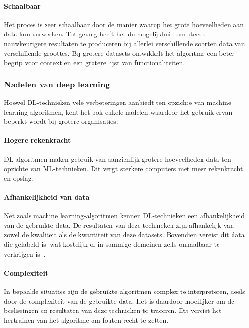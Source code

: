 \paragraph{Schaalbaar}
Het proces is zeer schaalbaar door de manier waarop het grote hoeveelheden aan data kan verwerken.
Tot gevolg heeft het de mogelijkheid om steeds nauwkeurigere resultaten te produceren bij allerlei verschillende soorten data van verschillende groottes.
Bij grotere datasets ontwikkelt het algoritme een beter begrip voor context en een grotere lijst van functionaliteiten.

\subsubsection{Nadelen van deep learning}
Hoewel DL-technieken vele verbeteringen aanbiedt ten opzichte van machine learning-algoritmen, kent het ook enkele nadelen waardoor het gebruik ervan beperkt wordt bij grotere organisaties:

\paragraph{Hogere rekenkracht}
DL-algoritmen maken gebruik van aanzienlijk grotere hoeveelheden data ten opzichte van ML-technieken.
Dit vergt sterkere computers met meer rekenkracht en opslag.

\paragraph{Afhankelijkheid van data}
Net zoals machine learning-algoritmen kennen DL-technieken een afhankelijkheid van de gebruikte data.
De resultaten van deze technieken zijn afhankelijk van zowel de kwaliteit als de kwantiteit van deze datasets.
Bovendien vereist dit data die gelabeld is, wat kostelijk of in sommige domeinen zelfs onhaalbaar te verkrijgen is~\autocite{Olaoye2024a}.

\paragraph{Complexiteit}
In bepaalde situaties zijn de gebruikte algoritmen complex te interpreteren, deels door de complexiteit van de gebruikte data.
Het is daardoor moeilijker om de beslissingen en resultaten van deze technieken te traceren.
Dit vereist het hertrainen van het algoritme om fouten recht te zetten.


